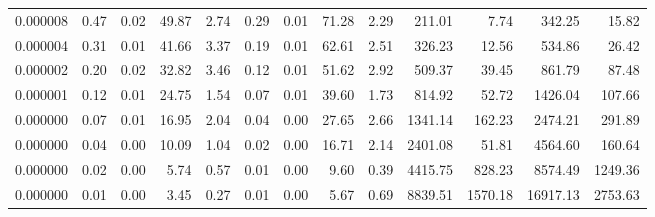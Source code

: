 \begin{tabular}{lrrrrrrrrrrrr}
0.000008 & 0.47 & 0.02 & 49.87 & 2.74 & 0.29 & 0.01 & 71.28 & 2.29 & 211.01 & 7.74 & 342.25 & 15.82 \\
0.000004 & 0.31 & 0.01 & 41.66 & 3.37 & 0.19 & 0.01 & 62.61 & 2.51 & 326.23 & 12.56 & 534.86 & 26.42 \\
0.000002 & 0.20 & 0.02 & 32.82 & 3.46 & 0.12 & 0.01 & 51.62 & 2.92 & 509.37 & 39.45 & 861.79 & 87.48 \\
0.000001 & 0.12 & 0.01 & 24.75 & 1.54 & 0.07 & 0.01 & 39.60 & 1.73 & 814.92 & 52.72 & 1426.04 & 107.66 \\
0.000000 & 0.07 & 0.01 & 16.95 & 2.04 & 0.04 & 0.00 & 27.65 & 2.66 & 1341.14 & 162.23 & 2474.21 & 291.89 \\
0.000000 & 0.04 & 0.00 & 10.09 & 1.04 & 0.02 & 0.00 & 16.71 & 2.14 & 2401.08 & 51.81 & 4564.60 & 160.64 \\
0.000000 & 0.02 & 0.00 & 5.74 & 0.57 & 0.01 & 0.00 & 9.60 & 0.39 & 4415.75 & 828.23 & 8574.49 & 1249.36 \\
0.000000 & 0.01 & 0.00 & 3.45 & 0.27 & 0.01 & 0.00 & 5.67 & 0.69 & 8839.51 & 1570.18 & 16917.13 & 2753.63 \\
\bottomrule
\end{tabular}
